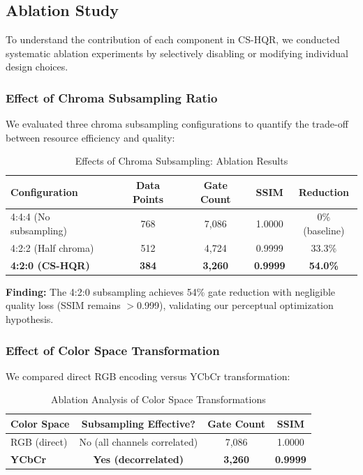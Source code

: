 \documentclass[11pt,a4paper]{article}
\begin{document}
\subsection{Ablation Study}

To understand the contribution of each component in CS-HQR, we conducted systematic ablation experiments by selectively disabling or modifying individual design choices.

\subsubsection{Effect of Chroma Subsampling Ratio}

We evaluated three chroma subsampling configurations to quantify the trade-off between resource efficiency and quality:

\begin{table}[H]
\centering
\caption{Effects of Chroma Subsampling: Ablation Results}
\label{tab:ablation_subsampling}
\begin{tabular}{@{}lcccc@{}}
\toprule
\textbf{Configuration} & \textbf{Data Points} & \textbf{Gate Count} & \textbf{SSIM} & \textbf{Reduction} \\
\midrule
4:4:4 (No subsampling) & 768 & 7,086 & 1.0000 & 0\% (baseline) \\
4:2:2 (Half chroma) & 512 & 4,724 & 0.9999 & 33.3\% \\
\rowcolor{green!15}
\textbf{4:2:0 (CS-HQR)} & \textbf{384} & \textbf{3,260} & \textbf{0.9999} & \textbf{54.0\%} \\
\bottomrule
\end{tabular}
\end{table}

\textbf{Finding:} The 4:2:0 subsampling achieves 54\% gate reduction with negligible quality loss (SSIM remains $>$0.999), validating our perceptual optimization hypothesis.

\subsubsection{Effect of Color Space Transformation}

We compared direct RGB encoding versus YCbCr transformation:

\begin{table}[H]
\centering
\caption{Ablation Analysis of Color Space Transformations}
\label{tab:ablation_colorspace}
\begin{tabular}{@{}lccc@{}}
\toprule
\textbf{Color Space} & \textbf{Subsampling Effective?} & \textbf{Gate Count} & \textbf{SSIM} \\
\midrule
RGB (direct) & No (all channels correlated) & 7,086 & 1.0000 \\
\rowcolor{green!15}
\textbf{YCbCr} & \textbf{Yes (decorrelated)} & \textbf{3,260} & \textbf{0.9999} \\
\bottomrule
\end{tabular}
\end{table}
\end{document}
